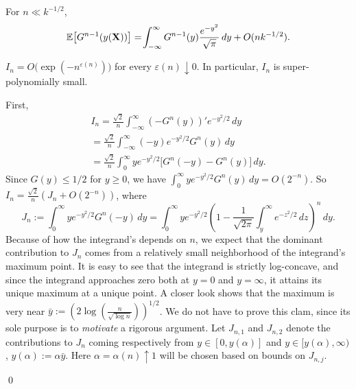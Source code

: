 \documentclass[10pt,a4paper]{amsart}
\def\a{\alpha}
\def\eps{\varepsilon}
\newenvironment{proof}{\noindent{\bf Proof:}}{\qed}
\begin{document}
\begin{lemma}\label{nlem2} For $n\ll k^{-1/2}$,
\begin{equation*}
\Bbb E\bigl[G^{n-1}(y(\bold X))\bigr]=\!\int_{-\infty}^{\infty}G^{n-1}(y)\frac{e^{-y^2}}{\sqrt{\pi}}\,dy +O(nk^{-1/2}).
\end{equation*}
\end{lemma}

\begin{lemma}\label{nlem3} $I_n=O\bigl(\exp(-n^{\eps(n)})\bigr)$ for every $\eps(n)\downarrow 0$. In particular, $I_n$ is super-polynomially small.
\end{lemma}

\begin{proof} 
First,  
\begin{multline*}
I_{n}=\frac{\sqrt{2}}{n}
\int_{-\infty}^{\infty}(-G^n(y))' e^{-y^2/2}\,dy\\
=\frac{\sqrt{2}}{n}\int_{-\infty}^{\infty}(-y)e^{-y^2/2}G^{n}(y)\,dy\\
=\frac{\sqrt{2}}{n}\int_0^{\infty} ye^{-y^2/2}\bigl[G^{n}(-y)-G^{n}(y)\bigr]\,dy.
\end{multline*}
Since $G(y)\le 1/2$ for $y\ge 0$, we have $
\int_0^{\infty} ye^{-y^2/2}G^{n}(y)\,dy=O(2^{-n})$. So $I_n=\frac{\sqrt{2}}{n}(J_n+O(2^{-n}))$, where 
\[
J_n:=\int_0^{\infty}ye^{-y^2/2} G^{n}(-y)\,dy=\int_0^{\infty}ye^{-y^2/2}\left(1-\frac{1}{\sqrt{2\pi}}\int_y^{\infty}e^{-z^2/2}\,dz\right)^n\,dy.
\]
Because of how the integrand's depends on $n$, we expect that the dominant contribution to $J_n$ comes from a relatively small neighborhood of the integrand's maximum point. It is easy to see that the integrand is strictly log-concave, and since the integrand approaches zero both at $y=0$ and $y=\infty$, it attains its unique maximum at a unique point. A closer look shows that the maximum
is very near $\bar y:=\left(2\log\left(\frac{n}{\sqrt{\log n}}\right)\right)^{1/2}$. We do not have to prove this clam, since its sole purpose is to 
{\it motivate\/} a rigorous argument. 
Let $J_{n,1}$ and $J_{n,2}$ denote the contributions to $J_n$ coming respectively from $y\in [0,y(\a)]$ and $y\in [y(\a),\infty)$, $y(\a):=\a \bar y$. Here $\a=\a(n)\uparrow 1$ will be chosen based on bounds on $J_{n,j}$.


\end{proof}
\end{document}
